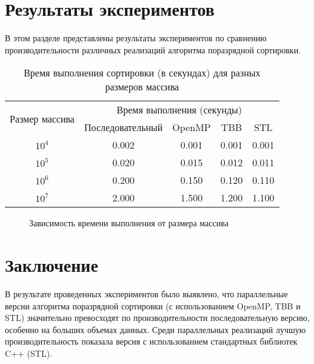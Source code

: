 \documentclass[]{article}
\theoremstyle{remark}
\theoremstyle{definition}
\begin{document}
\newpage

\section{Результаты экспериментов}

\par В этом разделе представлены результаты экспериментов по сравнению производительности различных реализаций алгоритма поразрядной сортировки.

\begin{table}[h!]
\centering
\caption{Время выполнения сортировки (в секундах) для разных размеров массива}
\begin{tabular}{|c|c|c|c|c|}
\hline
\multirow{2}{*}{Размер массива} & \multicolumn{4}{c|}{Время выполнения (секунды)} \\ \cline{2-5} 
                                & Последовательный & OpenMP & TBB & STL \\ \hline
$10^4$                          & 0.002            & 0.001 & 0.001 & 0.001 \\ \hline
$10^5$                          & 0.020            & 0.015 & 0.012 & 0.011 \\ \hline
$10^6$                          & 0.200            & 0.150 & 0.120 & 0.110 \\ \hline
$10^7$                          & 2.000            & 1.500 & 1.200 & 1.100 \\ \hline
\end{tabular}
\end{table}


\begin{figure}[h!]
\centering

\caption{Зависимость времени выполнения от размера массива}
\end{figure}

\newpage

\section{Заключение}

\par В результате проведенных экспериментов было выявлено, что параллельные версии алгоритма поразрядной сортировки (с использованием OpenMP, TBB и STL) значительно превосходят по производительности последовательную версию, особенно на больших объемах данных. Среди параллельных реализаций лучшую производительность показала версия с использованием стандартных библиотек C++ (STL). 
\end{document}
